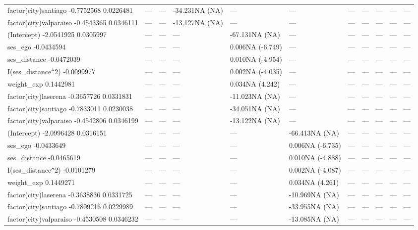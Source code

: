 \begin{table}[ht]
\begin{tabular}{lllllllllll}
  factor(city)santiago -0.7752568 0.0226481 & --- & --- & -34.231NA (NA) & --- & --- & --- & --- & --- & --- & --- \\ 
  factor(city)valparaiso -0.4543365 0.0346111 & --- & --- & -13.127NA (NA) & --- & --- & --- & --- & --- & --- & --- \\ 
  (Intercept) -2.0541925 0.0305997 & --- & --- & --- & -67.131NA (NA) & --- & --- & --- & --- & --- & --- \\ 
  ses\_ego -0.0434594 & --- & --- & --- & 0.006NA (-6.749) & --- & --- & --- & --- & --- & --- \\ 
  ses\_distance -0.0472039 & --- & --- & --- & 0.010NA (-4.954) & --- & --- & --- & --- & --- & --- \\ 
  I(ses\_distance\verb|^|2) -0.0099977 & --- & --- & --- & 0.002NA (-4.035) & --- & --- & --- & --- & --- & --- \\ 
  weight\_exp 0.1442981 & --- & --- & --- & 0.034NA (4.242) & --- & --- & --- & --- & --- & --- \\ 
  factor(city)laserena -0.3657726 0.0331831 & --- & --- & --- & -11.023NA (NA) & --- & --- & --- & --- & --- & --- \\ 
  factor(city)santiago -0.7833011 0.0230038 & --- & --- & --- & -34.051NA (NA) & --- & --- & --- & --- & --- & --- \\ 
  factor(city)valparaiso -0.4542806 0.0346199 & --- & --- & --- & -13.122NA (NA) & --- & --- & --- & --- & --- & --- \\ 
  (Intercept) -2.0996428 0.0316151 & --- & --- & --- & --- & -66.413NA (NA) & --- & --- & --- & --- & --- \\ 
  ses\_ego -0.0433649 & --- & --- & --- & --- & 0.006NA (-6.735) & --- & --- & --- & --- & --- \\ 
  ses\_distance -0.0465619 & --- & --- & --- & --- & 0.010NA (-4.888) & --- & --- & --- & --- & --- \\ 
  I(ses\_distance\verb|^|2) -0.0101279 & --- & --- & --- & --- & 0.002NA (-4.087) & --- & --- & --- & --- & --- \\ 
  weight\_exp 0.1449271 & --- & --- & --- & --- & 0.034NA (4.261) & --- & --- & --- & --- & --- \\ 
  factor(city)laserena -0.3638836 0.0331725 & --- & --- & --- & --- & -10.969NA (NA) & --- & --- & --- & --- & --- \\ 
  factor(city)santiago -0.7809216 0.0229989 & --- & --- & --- & --- & -33.955NA (NA) & --- & --- & --- & --- & --- \\ 
  factor(city)valparaiso -0.4530508 0.0346232 & --- & --- & --- & --- & -13.085NA (NA) & --- & --- & --- & --- & --- \\ 

\end{tabular}
\end{table}
